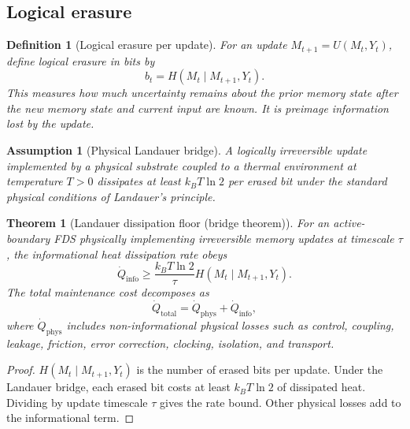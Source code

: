 \documentclass[10pt,a4paper,twocolumn,aps,prl]{revtex4-2}
\newtheorem{definition}{Definition}
\newtheorem{assumption}{Assumption}
\newtheorem{theorem}{Theorem}
\begin{document}
\subsection{Logical erasure}

\begin{definition}[Logical erasure per update]
For an update $M_{t+1}=U(M_t,Y_t)$, define logical erasure in bits by
\begin{equation}
b_t=H(M_t\mid M_{t+1},Y_t).
\label{eq:logical-erasure}
\end{equation}
This measures how much uncertainty remains about the prior memory state after the new memory state and current input are known. It is preimage information lost by the update.
\end{definition}

\begin{assumption}[Physical Landauer bridge]
A logically irreversible update implemented by a physical substrate coupled to a thermal environment at temperature $T>0$ dissipates at least $k_B T\ln 2$ per erased bit under the standard physical conditions of Landauer's principle.
\end{assumption}

\begin{theorem}[Landauer dissipation floor (bridge theorem)]
For an active-boundary FDS physically implementing irreversible memory updates at timescale $\tau$, the informational heat dissipation rate obeys
\begin{equation}
\dot Q_{\mathrm{info}}\geq \frac{k_B T\ln 2}{\tau}H(M_t\mid M_{t+1},Y_t).
\label{eq:landauer-floor}
\end{equation}
The total maintenance cost decomposes as
\begin{equation}
\dot Q_{\mathrm{total}}=\dot Q_{\mathrm{phys}}+\dot Q_{\mathrm{info}},
\label{eq:qtotal}
\end{equation}
where $\dot Q_{\mathrm{phys}}$ includes non-informational physical losses such as control, coupling, leakage, friction, error correction, clocking, isolation, and transport.
\end{theorem}

\begin{proof}
$H(M_t\mid M_{t+1},Y_t)$ is the number of erased bits per update. Under the Landauer bridge, each erased bit costs at least $k_B T\ln 2$ of dissipated heat. Dividing by update timescale $\tau$ gives the rate bound. Other physical losses add to the informational term.
\end{proof}
\end{document}
